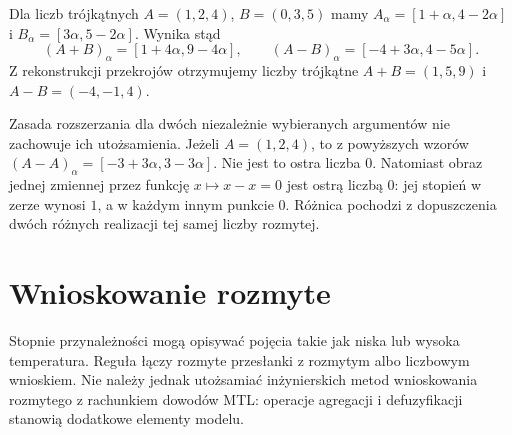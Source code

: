 \begin{przyklad}
\label{ex:lst-fuzzy-triangular-arithmetic}
Dla liczb trójkątnych $A=(1,2,4)$, $B=(0,3,5)$
mamy $A_\alpha=[1+\alpha,4-2\alpha]$ i
$B_\alpha=[3\alpha,5-2\alpha]$.
Wynika stąd
\[
 (A+B)_\alpha=[1+4\alpha,9-4\alpha],
 \qquad
 (A-B)_\alpha=[-4+3\alpha,4-5\alpha].
\]
Z rekonstrukcji przekrojów otrzymujemy liczby trójkątne
$A+B=(1,5,9)$ i $A-B=(-4,-1,4)$.
\begin{center}
\end{center}
\end{przyklad}

\begin{uwaga}\label{rem:lst-fuzzy-dependent-arguments}
Zasada rozszerzania dla dwóch niezależnie wybieranych
argumentów nie zachowuje ich utożsamienia.
Jeżeli $A=(1,2,4)$, to z powyższych wzorów
$(A-A)_\alpha=[-3+3\alpha,3-3\alpha]$.
Nie jest to ostra liczba $0$. Natomiast obraz jednej
zmiennej przez funkcję $x\mapsto x-x=0$ jest ostrą
liczbą $0$: jej stopień w zerze wynosi $1$, a w każdym
innym punkcie $0$. Różnica pochodzi z dopuszczenia
dwóch różnych realizacji tej samej liczby rozmytej.
\end{uwaga}



\section{Wnioskowanie rozmyte}
Stopnie przynależności mogą opisywać pojęcia takie jak
niska lub wysoka temperatura. Reguła łączy rozmyte
przesłanki z rozmytym albo liczbowym wnioskiem.
Nie należy jednak utożsamiać inżynierskich metod
wnioskowania rozmytego z rachunkiem dowodów MTL:
operacje agregacji i defuzyfikacji stanowią dodatkowe
elementy modelu.

